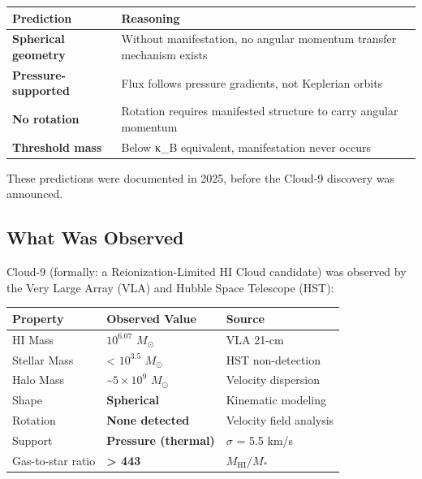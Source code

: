 \documentclass[
  11pt,
  letterpaper,
  twoside,
  openany]{book}
\makeatletter
\let\orig@subsection\subsection
\renewcommand{\subsection}{\needspace{6\baselineskip}\orig@subsection}
\makeatother
\begin{document}
\begin{longtable}[]{@{}
  >{\raggedright\arraybackslash}p{}
  >{\raggedright\arraybackslash}p{}@{}}
\toprule\noalign{}
\begin{minipage}[b]{\linewidth}\raggedright
Prediction
\end{minipage} & \begin{minipage}[b]{\linewidth}\raggedright
Reasoning
\end{minipage} \\
\midrule\noalign{}
\endhead
\bottomrule\noalign{}
\endlastfoot
\textbf{Spherical geometry} & Without manifestation, no angular momentum
transfer mechanism exists \\
\textbf{Pressure-supported} & Flux follows pressure gradients, not
Keplerian orbits \\
\textbf{No rotation} & Rotation requires manifested structure to carry
angular momentum \\
\textbf{Threshold mass} & Below κ\_B equivalent, manifestation never
occurs \\
\end{longtable}

These predictions were documented in 2025, before the Cloud-9 discovery
was announced.

\subsection{What Was Observed}\label{what-was-observed}

Cloud-9 (formally: a Reionization-Limited HI Cloud candidate) was
observed by the Very Large Array (VLA) and Hubble Space Telescope (HST):

\begin{longtable}[]{@{}lll@{}}
\toprule\noalign{}
Property & Observed Value & Source \\
\midrule\noalign{}
\endhead
\bottomrule\noalign{}
\endlastfoot
HI Mass & \(10^{6.07}\) \(M_\odot\) & VLA 21-cm \\
Stellar Mass & \textless{} \(10^{3.5}\) \(M_\odot\) & HST
non-detection \\
Halo Mass & \textasciitilde{}\(5 \times 10^9\) \(M_\odot\) & Velocity
dispersion \\
Shape & \textbf{Spherical} & Kinematic modeling \\
Rotation & \textbf{None detected} & Velocity field analysis \\
Support & \textbf{Pressure (thermal)} & \(\sigma\) = 5.5 km/s \\
Gas-to-star ratio & \textbf{\textgreater{} 443} &
\(M_{\text{HI}} / M_*\) \\
\end{longtable}
\end{document}
